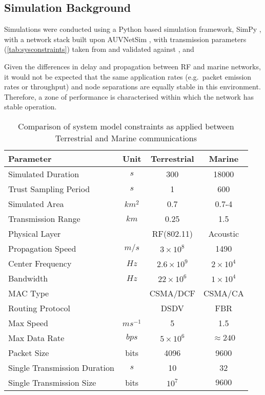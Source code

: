 \subsection{Simulation Background}

Simulations were conducted using a Python based simulation framework, SimPy \cite{Mueller2003SimPy}, with a network stack built upon AUVNetSim \cite{Miquel2008}, with transmission parameters (\autoref{tab:sysconstraints}) taken from and validated against \cite{Stojanovic2007}, \cite{Stefanov2011} and \cite{Sehgal2010}

Given the differences in delay and propagation between RF and marine networks, it would not be expected that the same application rates (e.g.\ packet emission rates or throughput) and node separations are equally stable in this environment.
Therefore, a zone of performance is characterised within which the network has stable operation.
%
\begin{table}[h]
	\caption{Comparison of system model constraints as applied between Terrestrial and Marine communications} \label{tab:sysconstraints}
	\begin{center}
		\setlength{\tabcolsep}{8pt}
		\begin{tabular}{lccc}
			\toprule
			Parameter & Unit & Terrestrial & Marine \\
			\midrule
			Simulated Duration & $s$ & 300 & 18000\\
			Trust Sampling Period & $s$ & 1 & 600 \\
			Simulated Area & $km^2$ & 0.7 & 0.7-4 \\
			Transmission Range & $km$ & 0.25 & 1.5 \\
			Physical Layer & & RF(802.11) & Acoustic\\
			Propagation Speed& $m/s$ & $3\times10^8$ & 1490\\
			Center Frequency& $Hz$ & $2.6\times10^9$ & $2 \times 10^4$ \\
			Bandwidth& $Hz$ & $22\times10^6$ & $1\times10^4$\\
			MAC Type & & CSMA/DCF & CSMA/CA\\
			Routing Protocol & & DSDV & FBR \\
			Max Speed & $ms^{-1}$ & 5 & 1.5 \\
			Max Data Rate & $bps$ & $5\times10^6$ & $\approx 240$ \\
			Packet Size & bits & 4096 &  9600 \\
			Single Transmission Duration & $s$ & 10 & 32 \\
			Single Transmission Size & bits & $10^7$ & $9600$ \\
			\bottomrule
		\end{tabular}
		\setlength{\tabcolsep}{6pt}
	\end{center}
\end{table}
%


